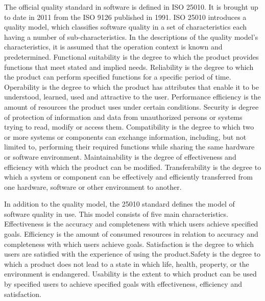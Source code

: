  
The official quality standard in software is defined in ISO 25010. It is brought up to date in 2011 from the ISO 9126 published in 1991. ISO 25010 introduces a quality model, which classifies software quality in a set of characteristics each having a number of sub-characteristics. In the descriptions of the quality model's characteristics, it is assumed that the operation context is known and predetermined. Functional suitability is the degree to which the product provides functions that meet stated and implied needs. Reliability is the degree to which the product can perform specified functions for a specific period of time. Operability is the degree to which the product has attributes that enable it to be understood, learned, used and attractive to the user. Performance efficiency is the amount of resources the product uses under certain conditions. Security is degree of protection of information and data from unauthorized persons or systems trying to read, modify or access them. Compatibility is the degree to which two or more systems or components can exchange information, including, but not limited to, performing their required functions while sharing the same hardware or software environment. Maintainability is the degree of effectiveness and efficiency with which the product can be modified.  Transferability is the degree to which a system or component can be effectively and efficiently transferred from one hardware, software or other environment to another.

In addition to the quality model, the 25010 standard defines the model of software quality in use. This model consists of five main characteristics. Effectiveness is the accuracy and completeness with which users achieve specified goals. Efficiency is the amount of consumed resources in relation to accuracy and completeness with which users achieve goals. Satisfaction is the degree to which users are satisfied with the experience of using the product.Safety is the degree to which a product does not lead to a state in which life, health, property, or the environment is endangered. Usability is the extent to which product can be used by specified users to achieve specified goals with effectiveness, efficiency and satisfaction.~\cite{TODO: Voiko viitata blogiin, jossa kiteytetään ISO 25010}



